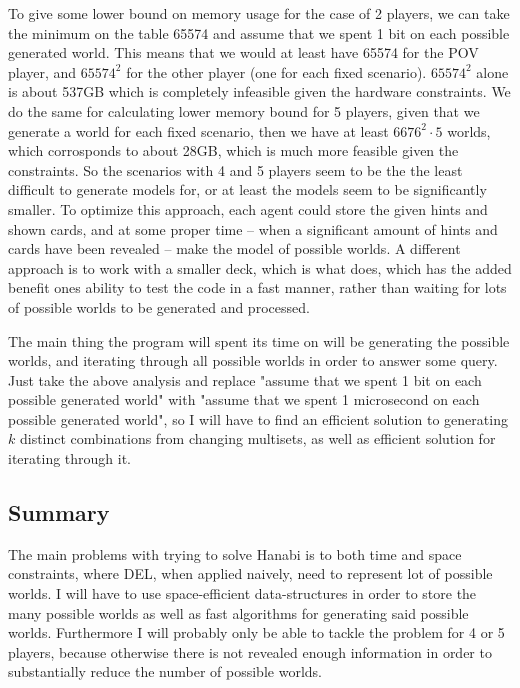 To give some lower bound on memory usage for the case of 2 players, we can take the minimum on the table 65574 and assume that we spent 1 bit on each possible generated world. This means that we would at least have 65574 for the POV player, and $65574^2$ for the other player (one for each fixed scenario). $65574^2$ alone is about 537GB which is completely infeasible given the hardware constraints. 
We do the same for calculating lower memory bound for 5 players, given that we generate a world for each fixed scenario, then we have at least $6676^2 \cdot 5$ worlds, which corrosponds to about 28GB, which is much more feasible given the constraints.
So the scenarios with 4 and 5 players seem to be the the least difficult to generate models for, or at least the models seem to be significantly smaller.
To optimize this approach, each agent could store the given hints and shown cards, and at some proper time -- when a significant amount of hints and cards have been revealed -- make the model of possible worlds. A different approach is to work with a smaller deck, which is what \cite{EgerAndMartens17} does, which has the added benefit ones ability to test the code in a fast manner, rather than waiting for lots of possible worlds to be generated and processed.

The main thing the program will spent its time on will be generating the possible worlds, and iterating through all possible worlds in order to answer some query. Just take the above analysis and replace "assume that we spent 1 bit on each possible generated world" with "assume that we spent 1 microsecond on each possible generated world", so I will have to find an efficient solution to generating $k$ distinct combinations from changing multisets, as well as efficient solution for iterating through it.

\subsection{Summary}
The main problems with trying to solve Hanabi is to both time and space constraints, where DEL, when applied naively, need to represent lot of possible worlds. 
I will have to use space-efficient data-structures in order to store the many possible worlds as well as fast algorithms for generating said possible worlds. 
Furthermore I will probably only be able to tackle the problem for 4 or 5 players, because otherwise there is not revealed enough information in order to substantially reduce the number of possible worlds.
